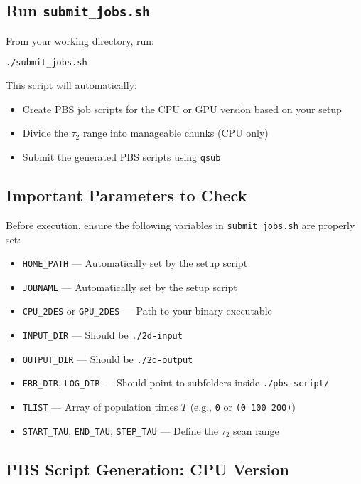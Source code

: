 \documentclass{article}
\begin{document}
\subsection*{Run \texttt{submit\_jobs.sh}}

From your working directory, run:

\begin{lstlisting}[language=bash]
./submit_jobs.sh
\end{lstlisting}

This script will automatically:
\begin{itemize}
    \item Create PBS job scripts for the CPU or GPU version based on your setup
    \item Divide the \(\tau_2\) range into manageable chunks (CPU only)
    \item Submit the generated PBS scripts using \texttt{qsub}
\end{itemize}

\subsection*{Important Parameters to Check}

Before execution, ensure the following variables in \texttt{submit\_jobs.sh} are properly set:

\begin{itemize}
    \item \texttt{HOME\_PATH} — Automatically set by the setup script
    \item \texttt{JOBNAME} — Automatically set by the setup script
    \item \texttt{CPU\_2DES} or \texttt{GPU\_2DES} — Path to your binary executable
    \item \texttt{INPUT\_DIR} — Should be \texttt{./2d-input}
    \item \texttt{OUTPUT\_DIR} — Should be \texttt{./2d-output}
    \item \texttt{ERR\_DIR}, \texttt{LOG\_DIR} — Should point to subfolders inside \texttt{./pbs-script/}
    \item \texttt{TLIST} — Array of population times \(T\) (e.g., \texttt{0} or \texttt{(0 100 200)})
    \item \texttt{START\_TAU}, \texttt{END\_TAU}, \texttt{STEP\_TAU} — Define the \(\tau_2\) scan range
\end{itemize}

\subsection*{PBS Script Generation: CPU Version}
\end{document}

